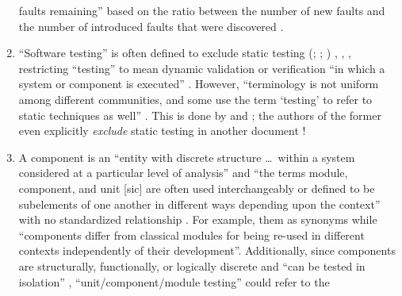 \begin{enumerate}
          faults remaining'' \citep[p.~165]{IEEE2017} based on the ratio
          between the number of new faults and the number of introduced faults
          that were discovered \citep[p.~427]{vanVliet2000}.
    \item %
          ``Software testing'' is often defined to exclude static testing
          \ifnotpaper
              (\citealp[p.~13]{Firesmith2015}; \citealp[p.~222]{AmmannAndOffutt2017};
              \citealp[p.~439]{PetersAndPedrycz2000})%
          \else
              \cite[p.~439]{PetersAndPedrycz2000}, \cite[p.~13]{Firesmith2015},
              \cite[p.~222]{AmmannAndOffutt2017}%
          \fi, restricting ``testing'' to mean dynamic validation
          \citep[p.~5\=/1]{SWEBOK2024} or verification ``in which a system or
          component is executed'' \citep[p.~427]{IEEE2017}. However,
          ``terminology is not uniform among different communities, and some
          use the term `testing' to refer to static techniques%
           as well'' \citep[p.~5\=/2]{SWEBOK2024}.
          This is done by \citet[pp.~16\==17]{IEEE2022} and
          \citet[pp.~8--9]{Gerrard2000a}; the \ifnotpaper \else authors of the
          \fi former even explicitly \emph{exclude} static testing in another
          document \citeyearpar[p.~440]{IEEE2017}!
    \item %
          A component is an ``entity with discrete structure \dots\ within a
          system considered at a particular level of analysis''
          \citep{ISO_IEC2023b} and ``the terms module, component, and unit
              [sic] are often used interchangeably or defined to be subelements
          of one another in different ways depending upon the context'' with
          no standardized relationship \citep[p.~82]{IEEE2017}. For example,
          \citetISTQB{}  them as synonyms while
          \citet[p.~107]{BaresiAndPezzè2006}  ``components
          differ from classical modules for being re-used in different contexts
          independently of their development''. Additionally, since components
          are structurally, functionally, or logically discrete
          \citep[p.~419]{IEEE2017} and ``can be tested in isolation''
          \citepISTQB{}, ``unit/component/module testing'' could refer to the

\end{enumerate}

